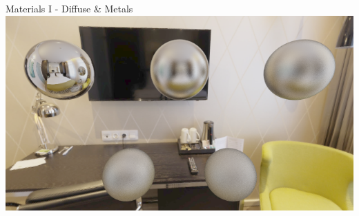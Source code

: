 \documentclass[xcolor=table]{beamer}
\begin{document}
\begin{frame}{Materials I - Diffuse \& Metals}
{   }
   {
   	\includegraphics[scale=0.25]{media/example_metals.png}
   }

\end{frame}
\end{document}

